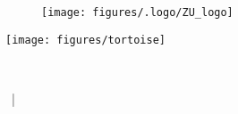 \begin{titlepage}
	\begin{figure}[t]
		\flushright
		\texttt{[image: figures/.logo/ZU\_logo]}
	\end{figure}
	
	\vspace*{3 cm}
	
	\centering
	
	\texttt{[image: figures/tortoise]}
	
	
	
	
	\centering {\Huge \Title}\\
	\smallskip
	\centering {\Large \Subtitle}
	
	
	\vspace{\fill}
	
	
	\centering \Name  ~| \Programme
\end{titlepage}